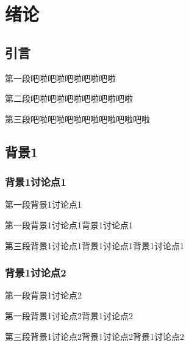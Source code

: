\chapter{绪论}

\section{引言}

第一段吧啦吧啦吧啦吧啦吧啦

第二段吧啦吧啦吧啦吧啦吧啦吧啦

第三段吧啦吧啦吧啦吧啦吧啦吧啦吧啦

\section{背景1}

\subsection{背景1讨论点1}

第一段背景1讨论点1

第一段背景1讨论点1背景1讨论点1

第三段背景1讨论点1背景1讨论点1背景1讨论点1

\subsection{背景1讨论点2}

第一段背景1讨论点2

第一段背景1讨论点2背景1讨论点2

第三段背景1讨论点2背景1讨论点2背景1讨论点2
